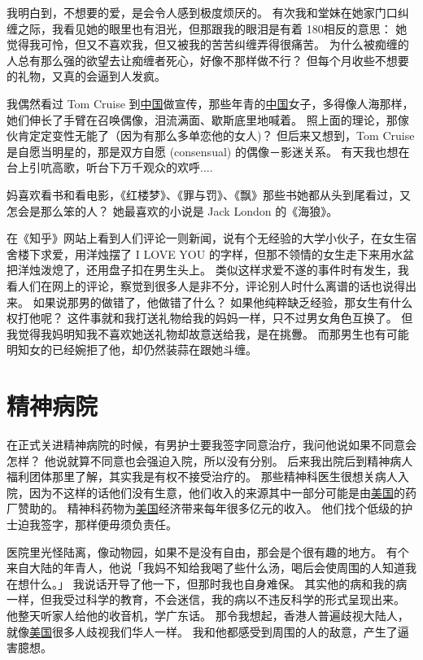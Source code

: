 \documentclass[12pt]{report}
\begin{document}
我明白到，不想要的爱，是会令人感到极度烦厌的。 有次我和堂妹在她家门口纠缠之际，我看见她的眼里也有泪光，但那跟我的眼泪是有着 180\textdegree 相反的意思： 她觉得我可怜，但又不喜欢我，但又被我的苦苦纠缠弄得很痛苦。 为什么被痴缠的人总有那么强的欲望去让痴缠者死心，好像不那样做不行？ 但每个月收些不想要的礼物，又真的会逼到人发疯。

我偶然看过 Tom Cruise 到\uline{中国}做宣传，那些年青的\uline{中国}女子，多得像人海那样，她们伸长了手臂在召唤偶像，泪流满面、歇斯底里地喊着。 照上面的理论，那傢伙肯定定变性无能了（因为有那么多单恋他的女人)？ 但后来又想到，Tom Cruise 是自愿当明星的，那是双方自愿 (consensual) 的偶像－影迷关系。 有天我也想在台上引吭高歌，听台下万千观众的欢呼....

妈喜欢看书和看电影，《红楼梦》、《罪与罚》、《飘》那些书她都从头到尾看过，又怎会是那么笨的人？ 她最喜欢的小说是 Jack London 的《海狼》。

在《知乎》网站上看到人们评论一则新闻，说有个无经验的大学小伙子，在女生宿舍楼下求爱，用洋烛摆了 I LOVE YOU 的字样，但那不领情的女生走下来用水盆把洋烛泼熄了，还用盘子扣在男生头上。  类似这样求爱不遂的事件时有发生，我看人们在网上的评论，察觉到很多人是非不分，评论别人时什么离谱的话也说得出来。 如果说那男的做错了，他做错了什么？  如果他纯粹缺乏经验，那女生有什么权打他呢？  这件事就和我打送礼物给我的妈妈一样，只不过男女角色互换了。  但我觉得我妈明知我不喜欢她送礼物却故意送给我，是在挑釁。  而那男生也有可能明知女的已经婉拒了他，却仍然装蒜在跟她斗缠。


\chapter{精神病院}

在正式关进精神病院的时候，有男护士要我签字同意治疗，我问他说如果不同意会怎样？ 他说就算不同意也会强迫入院，所以没有分别。 后来我出院后到精神病人福利团体那里了解，其实我是有权不接受治疗的。 那些精神科医生很想关病人入院，因为不这样的话他们没有生意，他们收入的来源其中一部分可能是由\uline{美国}的药厂赞助的。 精神科药物为\uline{美国}经济带来每年很多亿元的收入。 他们找个低级的护士迫我签字，那样便毋须负责任。

医院里光怪陆离，像动物园，如果不是没有自由，那会是个很有趣的地方。 有个来自大陆的年青人，他说「我妈不知给我喝了些什么汤，喝后会使周围的人知道我在想什么。」 我说话开导了他一下，但那时我也自身难保。 其实他的病和我的病一样，但我受过科学的教育，不会迷信，我的病以不违反科学的形式呈现出来。 他整天听家人给他的收音机，学广东话。 那令我想起，香港人普遍歧视大陆人，就像\uline{美国}很多人歧视我们华人一样。 我和他都感受到周围的人的敌意，产生了逼害臆想。
\end{document}
